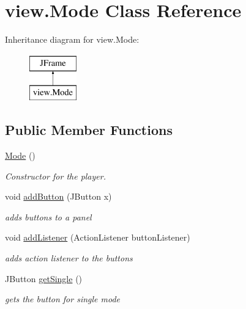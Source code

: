 \hypertarget{classview_1_1_mode}{}\section{view.\+Mode Class Reference}
\label{classview_1_1_mode}
Inheritance diagram for view.\+Mode\+:\begin{figure}[H]
\begin{center}
\leavevmode
\includegraphics[height=2.000000cm]{classview_1_1_mode}
\end{center}
\end{figure}
\subsection*{Public Member Functions}
\begin{DoxyCompactItemize}
\item 
\hyperlink{classview_1_1_mode_a55b668b8551b43596ab48afb749faec0}{Mode} ()
\begin{DoxyCompactList}\small\item\em Constructor for the player. \end{DoxyCompactList}\item 
void \hyperlink{classview_1_1_mode_a133b1b524c5ac2bb62da0f7f892c006d}{add\+Button} (J\+Button x)
\begin{DoxyCompactList}\small\item\em adds buttons to a panel \end{DoxyCompactList}\item 
void \hyperlink{classview_1_1_mode_a0f731453457f37dd1f3b16994a398c3e}{add\+Listener} (Action\+Listener button\+Listener)
\begin{DoxyCompactList}\small\item\em adds action listener to the buttons \end{DoxyCompactList}\item 
J\+Button \hyperlink{classview_1_1_mode_ad97ed0dc0beeb1f54affe3355846bf6a}{get\+Single} ()
\begin{DoxyCompactList}\small\item\em gets the button for single mode \end{DoxyCompactList}\end{DoxyCompactItemize}
